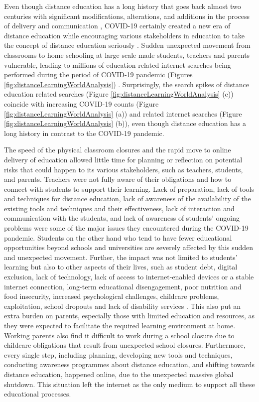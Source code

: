 \documentclass[11pt,a4paper,]{article}
\begin{document}
Even though distance education has a long history that goes back almost two centuries with significant modifications,
alterations, and additions in the process of delivery and communication \autocite{moore2011learning,spector2014handbook}, COVID-19 certainly created a new era of distance education while encouraging various stakeholders in education to take the concept of distance education seriously \autocite{richmond2020critical}. Sudden unexpected movement from classrooms to home schooling at large scale made students, teachers and parents vulnerable, leading to millions of education related internet searches being performed during the period of COVID-19 pandemic (Figures \ref{fig:distanceLearningWorldAnalysis}) \autocite{carter2021teacher}. Surprisingly, the search spikes of distance education related searches (Figure \ref{fig:distanceLearningWorldAnalysis} (c)) coincide with increasing COVID-19 counts (Figure \ref{fig:distanceLearningWorldAnalysis} (a)) and related internet searches (Figure \ref{fig:distanceLearningWorldAnalysis} (b)), even though distance education has a long history in contrast to the COVID-19 pandemic.

The speed of the physical classroom closures and the rapid move to online delivery of education allowed little time for planning or reflection on potential risks that could happen to its various stakeholders, such as teachers, students, and parents. Teachers were not fully aware of their obligations and how to connect with students to support their learning. Lack of preparation, lack of tools and techniques for distance education, lack of awareness of the availability of the existing tools and techniques and their effectiveness, lack of interaction and communication with the students, and lack of awareness of students' ongoing problems were some of the major issues they encountered during the COVID-19 pandemic. Students on the other hand who tend to have fewer educational opportunities beyond schools and universities are severely affected by this sudden and unexpected movement. Further, the impact was not limited to students' learning but also to other aspects of their lives, such as student debt, digital exclusion, lack of technology, lack of access to internet-enabled devices or a stable internet connection, long-term educational disengagement, poor nutrition and food insecurity, increased psychological challenges, childcare problems, exploitation, school dropouts and lack of disability services \autocite{drane2020impact,daniel2020education,unescoadverse2020,richmond2020critical,carter2021teacher}. This also put an extra burden on parents, especially those with limited education and resources, as they were expected to facilitate the required learning environment at home. Working parents also find it difficult to work during a school closure due to childcare obligations that result from unexpected school closures. Furthermore, every single step, including planning, developing new tools and techniques, conducting awareness programmes about distance education, and shifting towards distance education, happened online, due to the unexpected massive global shutdown. This situation left the internet as the only medium to support all these educational processes.
\end{document}
